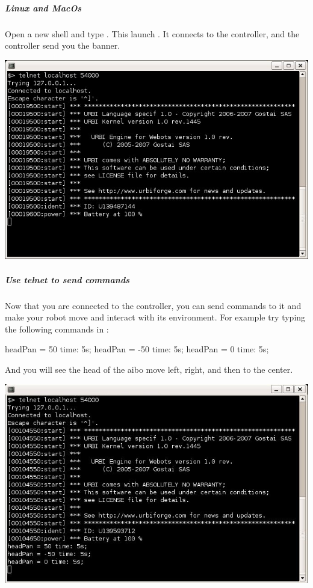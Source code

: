 \subparagraph{Linux and MacOs}

Open a new shell and type .  This
launch . It connects to the \urbi controller, and the
\urbi controller send you the \urbi banner.

\begin{center}
  \includegraphics[width=.8\linewidth]{img/webots/telnet-urbi-linux}
\end{center}

\subparagraph{Use telnet to send commands}

Now that you are connected to the \urbi controller, you can send
commands to it and make your robot move and interact with its
environment. For example try typing the following commands in
:

\begin{urbifixme}
headPan = 50 time: 5s;
headPan = -50 time: 5s;
headPan = 0 time: 5s;
\end{urbifixme}

And you will see the head of the aibo move left, right, and then to
the center.

\begin{center}
  \includegraphics[width=.8\linewidth]{img/webots/telnet-some-urbi-cmd}
\end{center}

